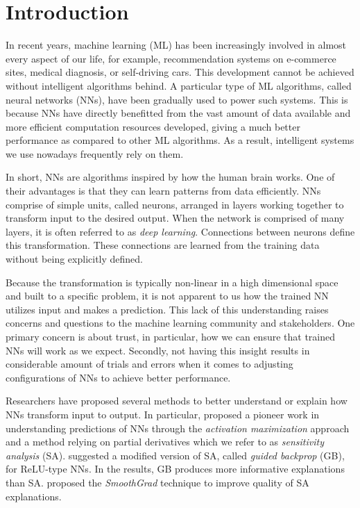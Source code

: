 \chapter{Introduction}
\label{cha:chapter1}
In recent years, machine learning (ML) has been increasingly involved in almost every aspect of our life, for example, recommendation systems on e-commerce sites, medical diagnosis, or self-driving cars. This development cannot be achieved without intelligent algorithms behind. A particular type of ML algorithms, called neural networks (NNs), have been gradually used to power such systems.  This is because NNs have directly benefitted from the vast amount of data available and more efficient computation resources developed, giving a much better performance as compared to other ML algorithms. As a result, intelligent systems we use nowadays frequently rely on them.

In short, NNs are algorithms inspired by how the human brain works. One of their advantages is that they can learn patterns from data efficiently. NNs comprise of simple units, called neurons, arranged in layers working together to transform input to the desired output. When the network is comprised of many layers, it is often referred to as \textit{deep learning}. Connections between neurons define this transformation. These connections are learned from the training data without being explicitly defined. 

Because the transformation is typically non-linear in a high dimensional space and built to a specific problem, it is not apparent to us how the trained NN utilizes input and makes a prediction.  This lack of this understanding raises concerns and questions to the machine learning community and stakeholders. One primary concern is about trust, in particular, how we can ensure that trained NNs will work as we expect. Secondly, not having this insight results in considerable amount of trials and errors when it comes to adjusting configurations of NNs to achieve better performance.

Researchers have proposed several methods to better understand or explain how NNs transform input to output. In particular, \citet{SimonyanDeepConvolutionalNetworks2013}  proposed a pioneer work in understanding predictions of NNs through the \textit{activation maximization} approach and a method relying on partial derivatives which we refer to as \textit{sensitivity analysis} (SA). \citet{SpringenbergStrivingSimplicityAll2015a} suggested a modified version of SA, called \textit{guided backprop} (GB), for ReLU-type NNs. In the results, GB produces more informative explanations than SA. \citet{SmilkovSmoothGradremovingnoise2017}  proposed the \textit{SmoothGrad} technique to improve quality of SA explanations. 

